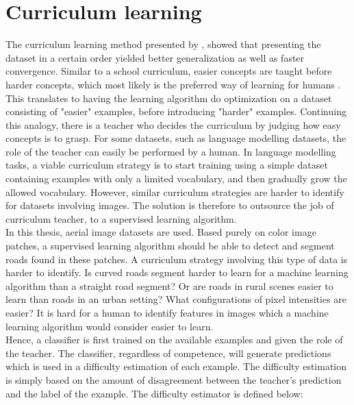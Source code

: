 \section{Curriculum learning}
\label{sec:curriculum_Learning}
The curriculum learning method presented by \cite{Bengio_curriculumlearning}, showed that presenting the dataset in a certain order yielded better generalization as well as faster convergence. Similar to a school curriculum, easier concepts are taught before harder concepts, which most likely is the preferred way of learning for humans \citep{Khan_human_teach}. This translates to having the learning algorithm do optimization on a dataset consisting of "easier" examples, before introducing "harder" examples. Continuing this analogy, there is a teacher who decides the curriculum by judging how easy concepts is to grasp. For some datasets, such as language modelling datasets, the role of the teacher can easily be performed by a human. In language modelling tasks, a viable curriculum strategy is to start training using a simple dataset containing examples with only a limited vocabulary, and then gradually grow the allowed vocabulary. However, similar curriculum strategies are harder to identify for datasets involving images. The solution is therefore to outsource the job of curriculum teacher, to a supervised learning algorithm.  \\

In this thesis, aerial image datasets are used. Based purely on color image patches, a supervised learning algorithm should be able to detect and segment roads found in these patches. A curriculum strategy involving this type of data is harder to identify. Is curved roads segment harder to learn for a machine learning algorithm than a straight road segment? Or are roads in rural scenes easier to learn than roads in an urban setting? What configurations of pixel intensities are easier? It is hard for a human to identify features in images which a machine learning algorithm would consider easier to learn. \\


Hence, a classifier is first trained on the available examples and given the role of the teacher. The classifier, regardless of competence, will generate predictions which is used in a difficulty estimation of each example. The difficulty estimation is simply based on the amount of disagreement between the teacher's prediction and the label of the example. The difficulty estimator is defined below:  \\

